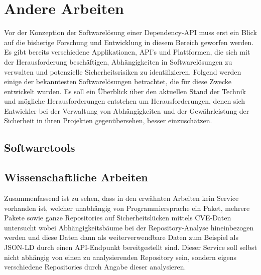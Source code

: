 \section{Andere Arbeiten} \label{sec:Andere}
    Vor der Konzeption der Softwarelösung einer Dependency-\ac{API} muss erst ein Blick auf die bisherige Forschung und Entwicklung in diesem Bereich geworfen werden.
    Es gibt bereits verschiedene Applikationen, \ac{API}'s und Plattformen, die sich mit der Herausforderung beschäftigen, Abhängigkeiten in Softwarelösungen zu verwalten und potenzielle Sicherheitsrisiken zu identifizieren.
    Folgend werden einige der bekanntesten Softwarelösungen betrachtet, die für diese Zwecke entwickelt wurden.
    Es soll ein Überblick über den aktuellen Stand der Technik und mögliche Herausforderungen entstehen um Herausforderungen, denen sich Entwickler bei der Verwaltung von Abhängigkeiten und der Gewährleistung der Sicherheit in ihren Projekten gegenübersehen, besser einzuschätzen.
    \subsection{Softwaretools} \label{subsec:Softwaretools}
    
    
    
    
    \newpage
    \subsection{Wissenschaftliche Arbeiten} \label{subsec:Wiss_Arbeiten}
    
    
    
    Zusammenfassend ist zu sehen, dass in den erwähnten Arbeiten kein Service vorhanden ist, welcher unabhängig von Programmiersprache ein Paket, mehrere Pakete sowie ganze Repositories auf Sicherheitslücken mittels CVE-Daten untersucht wobei Abhängigkeitsbäume bei der Repository-Analyse hineinbezogen werden und diese Daten dann als weiterverwendbare Daten zum Beispiel als JSON-LD durch einen API-Endpunkt bereitgestellt sind.
    Dieser Service soll selbst nicht abhängig von einen zu analysierenden Repository sein, sondern eigens verschiedene Repositories durch Angabe dieser analysieren. 